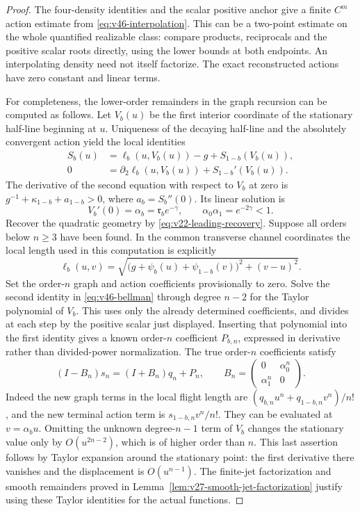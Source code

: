\begin{proof}
The four-density identities and the scalar positive anchor give a finite
$C^m$ action estimate from \eqref{eq:v46-interpolation}.  This can be a
two-point estimate on the whole quantified realizable class: compare
products, reciprocals and the positive scalar roots directly, using the
lower bounds at both endpoints.  An interpolating density need not itself
factorize.  The exact reconstructed actions have zero constant and linear
terms.

For completeness, the lower-order remainders in the graph recursion can
be computed as follows.  Let $V_b(u)$ be the first interior coordinate of
the stationary half-line beginning at $u$.  Uniqueness of the decaying
half-line and the absolutely convergent action yield the local identities
\begin{align}
 S_b(u)&=\ell_b(u,V_b(u))-g+S_{1-b}(V_b(u)),
       \label{eq:v46-bellman}\\
 0&=\partial_2\ell_b(u,V_b(u))+S_{1-b}'(V_b(u)).\nonumber
\end{align}
The derivative of the second equation with respect to $V_b$ at zero is
$g^{-1}+\kappa_{1-b}+a_{1-b}>0$, where $a_b=S_b''(0)$.
Its linear solution is
\[
 V_b'(0)=\alpha_b=\mathfrak r_b e^{-\gamma},
 \qquad \alpha_0\alpha_1=e^{-2\gamma}<1.
\]
Recover the quadratic geometry by \eqref{eq:v22-leading-recovery}.
Suppose all orders below $n\ge3$ have been found.  In the common transverse channel coordinates the local length used in
this computation is explicitly
\[
 \ell_b(u,v)=\sqrt{\bigl(g+\psi_b(u)+\psi_{1-b}(v)\bigr)^2+(v-u)^2}.
\]
Set the order-$n$ graph and action coefficients provisionally to zero.  Solve the second
identity in \eqref{eq:v46-bellman} through degree $n-2$ for the Taylor
polynomial of $V_b$.  This uses only the already determined coefficients,
and divides at each step by the positive scalar just displayed.  Inserting
that polynomial into the first identity gives a known order-$n$ coefficient
$P_{b,n}$, expressed in derivative rather than divided-power normalization.
The true order-$n$ coefficients satisfy
\begin{equation}\label{eq:v46-bellman-block}
 (I-B_n)s_n=(I+B_n)q_n+P_n,
 \qquad
 B_n=\begin{pmatrix}0&\alpha_0^n\\\alpha_1^n&0\end{pmatrix}.
\end{equation}
Indeed the new graph terms in the local flight length are
$(q_{b,n}u^n+q_{1-b,n}v^n)/n!$, and the new terminal action term is
$s_{1-b,n}v^n/n!$.  They can be evaluated at $v=\alpha_bu$.
Omitting the unknown degree-$n-1$ term of $V_b$ changes the stationary
value only by $O(u^{2n-2})$, which is of higher order than $n$.
This last assertion follows by Taylor expansion around the stationary
point: the first derivative there vanishes and the displacement is
$O(u^{n-1})$.  The finite-jet factorization and smooth remainders proved
in Lemma~\ref{lem:v27-smooth-jet-factorization} justify using these Taylor
identities for the actual functions.


\end{proof}
